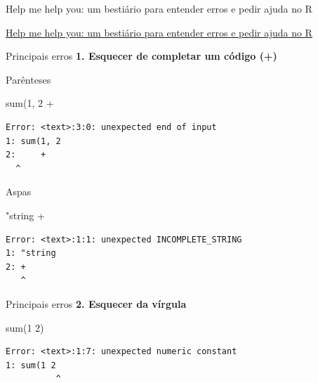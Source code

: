 \documentclass[
  ignorenonframetext,
]{beamer}
\newenvironment{Shaded}{\begin{snugshade}}{\end{snugshade}}
\newcommand{\DecValTok}[1]{\textcolor[rgb]{0.68,0.00,0.00}{#1}}
\newcommand{\FunctionTok}[1]{\textcolor[rgb]{0.28,0.35,0.67}{#1}}
\newcommand{\NormalTok}[1]{\textcolor[rgb]{0.00,0.23,0.31}{#1}}
\newcommand{\SpecialCharTok}[1]{\textcolor[rgb]{0.37,0.37,0.37}{#1}}
\newcommand{\StringTok}[1]{\textcolor[rgb]{0.13,0.47,0.30}{#1}}
\begin{document}
\begin{frame}[fragile]{}
\protect\hypertarget{section-6}{}
Help me help you: um bestiário para entender erros e pedir ajuda no R

\href{https://anotherecoblog.wordpress.com/2020/08/26/help-me-help-you-um-bestiario-para-entender-erros-e-pedir-ajuda-no-r/}{Help
me help you: um bestiário para entender erros e pedir ajuda no R}

\begin{block}{Principais erros}
\protect\hypertarget{principais-erros-1}{}
\textbf{1. Esquecer de completar um código (+)}

Parênteses

\begin{Shaded}
\begin{Highlighting}[]
\FunctionTok{sum}\NormalTok{(}\DecValTok{1}\NormalTok{, }\DecValTok{2}
    \SpecialCharTok{+}
\end{Highlighting}
\end{Shaded}

\begin{verbatim}
Error: <text>:3:0: unexpected end of input
1: sum(1, 2
2:     +
  ^
\end{verbatim}

Aspas

\begin{Shaded}
\begin{Highlighting}[]
\StringTok{"string}
\StringTok{+}
\end{Highlighting}
\end{Shaded}

\begin{verbatim}
Error: <text>:1:1: unexpected INCOMPLETE_STRING
1: "string
2: +
   ^
\end{verbatim}
\end{block}

\begin{block}{Principais erros}
\protect\hypertarget{principais-erros-2}{}
\textbf{2. Esquecer da vírgula}

\begin{Shaded}
\begin{Highlighting}[]
\FunctionTok{sum}\NormalTok{(}\DecValTok{1} \DecValTok{2}\NormalTok{)}
\end{Highlighting}
\end{Shaded}

\begin{verbatim}
Error: <text>:1:7: unexpected numeric constant
1: sum(1 2
          ^
\end{verbatim}


\end{block}
\end{frame}
\end{document}
